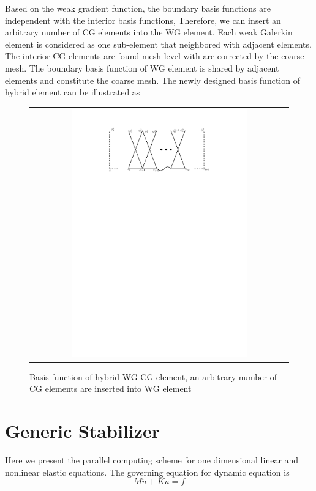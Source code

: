 Based on the weak gradient function, the boundary basis functions are independent with the interior basis functions, Therefore, we can insert an arbitrary number of CG elements into the WG element. Each weak Galerkin element is considered as one sub-element that neighbored with adjacent elements. The interior CG elements are found mesh level with are corrected by the coarse mesh. The boundary basis function of WG element is shared by adjacent elements and constitute the coarse mesh. The newly designed basis function of hybrid element can be illustrated as

\begin{figure}[h]
	\centering
	\begin{tabular}{c}
		\includegraphics[width=0.7\textwidth]{./pics/hybrid}
	\end{tabular}
	\caption{\footnotesize Basis function of hybrid WG-CG element, an arbitrary number of CG elements are inserted into WG element}
\end{figure}

\section{Generic Stabilizer}
Here we present the parallel computing scheme for one dimensional linear and nonlinear elastic equations. The governing equation for dynamic equation is 
\begin{equation}
M\ddot{u} + Ku = f
\end{equation}

